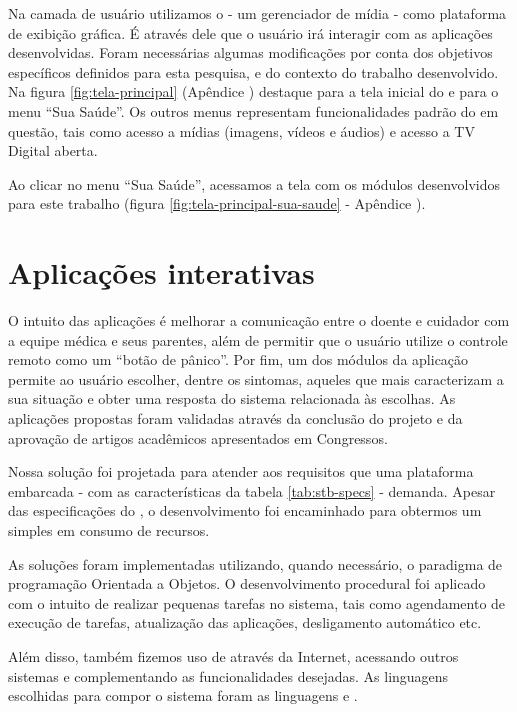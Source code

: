 
Na camada de usuário utilizamos o \software[] \xbmc[] - um gerenciador de mídia
- como plataforma de exibição gráfica. É através dele que o usuário irá 
interagir com as aplicações desenvolvidas. Foram necessárias algumas 
modificações por conta dos objetivos específicos definidos para esta pesquisa,
e do contexto do trabalho desenvolvido. Na figura \ref{fig:tela-principal}
(Apêndice )
destaque para a tela inicial do \software[] \xbmc[] e para o menu ``Sua Saúde''.
Os outros menus representam funcionalidades padrão do \software[] em questão,
tais como acesso a mídias (imagens, vídeos e áudios) e acesso a TV Digital aberta.

Ao clicar no menu ``Sua Saúde'', acessamos a tela com os módulos desenvolvidos
para este trabalho (figura \ref{fig:tela-principal-sua-saude} - Apêndice 
).

\section{Aplicações interativas} \label{subsec:aplicacoes-tv-health}

O intuito das aplicações é melhorar a comunicação entre o doente e cuidador com
a equipe médica e seus parentes, além de permitir que o usuário utilize o
controle remoto como um ``botão de pânico''. Por fim, um dos módulos da
aplicação permite ao usuário escolher, dentre os sintomas, aqueles que mais
caracterizam a sua situação e obter uma resposta do sistema relacionada às
escolhas. As aplicações  propostas foram validadas através da conclusão do
projeto \nextsaude[] e da aprovação de artigos acadêmicos apresentados em
Congressos.

Nossa solução foi projetada para atender aos requisitos que uma plataforma
embarcada - com as características da tabela \ref{tab:stb-specs} - demanda. Apesar 
das especificações do \hardware[], o desenvolvimento foi encaminhado para 
obtermos um \software[] simples em consumo de recursos.

As soluções foram implementadas utilizando, quando necessário, o paradigma
de programação Orientada a Objetos. O desenvolvimento procedural foi aplicado
com o intuito de realizar pequenas tarefas no sistema, tais como agendamento
de execução de tarefas, atualização das aplicações, desligamento automático etc.

Além disso, também fizemos uso de \webservices[] através da Internet, acessando
outros sistemas e complementando as funcionalidades desejadas. As linguagens
escolhidas para compor o sistema foram as linguagens \python[] e \shell.

